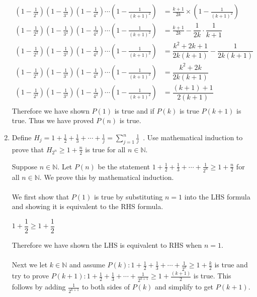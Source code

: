 \documentclass{article}
\newcommand{\D}{\displaystyle}
\begin{document}
\begin{enumerate}
\begin{align*}
	\D \left(1-\frac{1}{2^2} \right) \left(1-\frac{1}{3^2} \right)  \left(1-\frac{1}{4^2} \right)  \cdots  \left(1-\frac{1}{(k+1)^2} \right) &= \frac{k+1}{2k} \times \D \left(1-\frac{1}{(k+1)^2} \right)\\
	\D \left(1-\frac{1}{2^2} \right) \left(1-\frac{1}{3^2} \right)  \left(1-\frac{1}{4^2} \right)  \cdots  \left(1-\frac{1}{(k+1)^2} \right) &= \frac{k+1}{2k} - \dfrac{1}{2k} \cdot \dfrac{1}{k+1}\\
	\D \left(1-\frac{1}{2^2} \right) \left(1-\frac{1}{3^2} \right)  \left(1-\frac{1}{4^2} \right)  \cdots  \left(1-\frac{1}{(k+1)^2} \right) &= \dfrac{k^2+2k+1}{2k(k+1)}-\dfrac{1}{2k(k+1)}\\
	\D \left(1-\frac{1}{2^2} \right) \left(1-\frac{1}{3^2} \right)  \left(1-\frac{1}{4^2} \right)  \cdots  \left(1-\frac{1}{(k+1)^2} \right) &= \dfrac{k^2+2k}{2k(k+1)}\\
	\D \left(1-\frac{1}{2^2} \right) \left(1-\frac{1}{3^2} \right)  \left(1-\frac{1}{4^2} \right)  \cdots  \left(1-\frac{1}{(k+1)^2} \right) &= \dfrac{(k+1)+1}{2(k+1)}\\
\end{align*}
Therefore we have shown $P(1)$ is true and if $P(k)$ is true $P(k+1)$ is true. Thus we have proved $P(n)$ is true.
\item Define $\D H_j = 1 + \frac{1}{2} + \frac{1}{3} + \cdots + \frac{1}{j} = \sum_{j=1}^n \frac{1}{j}$~.  Use mathematical induction to prove that $\D H_{2^n} \geq 1 + \frac{n}{2}$ is true for all $n \in \mathbb{N}$. 
\vspace{.15in}

 Suppose $n \in \mathbb{N}$. Let $P(n)$ be the statement $\D 1 + \frac{1}{2} + \frac{1}{3} + \cdots + \frac{1}{2^n} \geq \D 1 + \frac{n}{2}$ for all $n \in \mathbb{N}$. We prove this by mathematical induction.\\\\
We first show that $P(1)$ is true by substituting $n = 1$ into the LHS formula and showing it is equivalent to the RHS formula.

\begin{center}
	$\D 1+\dfrac{1}{2} \geq 1+\dfrac{1}{2}$
\end{center}  
Therefore we have shown the LHS is equivalent to RHS when $n = 1$.\\\\
Next we let $k \in \mathbb{N}$ and assume $P(k):\D 1 + \frac{1}{2} + \frac{1}{3} + \cdots + \frac{1}{2^k} \geq \D 1 + \frac{k}{2}$ is true and try to prove $P(k+1):\D 1 + \frac{1}{2} + \frac{1}{3} + \cdots + \frac{1}{2^{k+1}} \geq \D 1 + \frac{(k+1)}{2}$ is true. This follows by adding $\D \frac{1}{2^{k+1}}$ to both sides of $P(k)$ and simplify to get $P(k+1)$.


\end{enumerate}
\end{document}

